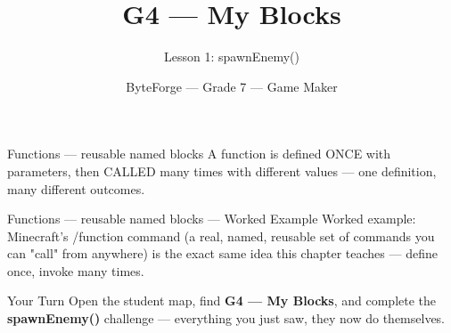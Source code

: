 \documentclass[aspectratio=169]{beamer}
\title{G4 — My Blocks}
\subtitle{Lesson 1: spawnEnemy()}
\author{ByteForge --- Grade 7 --- Game Maker}
\date{}
\begin{document}
\begin{frame}
    \titlepage
\end{frame}

\begin{frame}{Functions — reusable named blocks}
    \Large
    A function is defined ONCE with parameters, then CALLED many times with different values — one definition, many different outcomes.

    \begin{center}
    \end{center}
\end{frame}

\begin{frame}{Functions — reusable named blocks --- Worked Example}
    \Large
    Worked example: Minecraft's /function command (a real, named, reusable set of commands you can "call" from anywhere) is the exact same idea this chapter teaches — define once, invoke many times.
\end{frame}

\begin{frame}{Your Turn}
    \Large
    Open the student map, find \textbf{G4 — My Blocks}, and complete
    the \textbf{spawnEnemy()} challenge --- everything you just saw, they now do themselves.
\end{frame}
\end{document}
